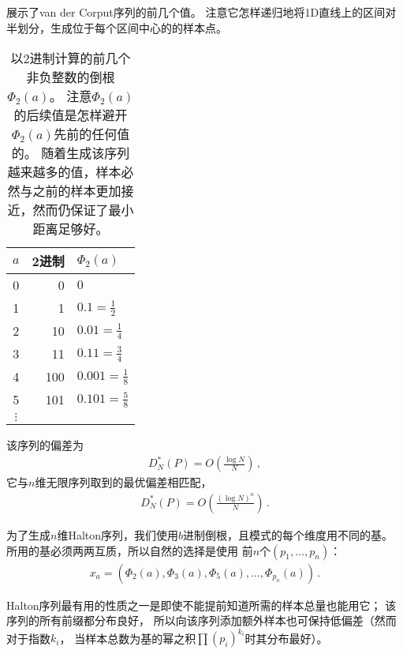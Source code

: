展示了van der Corput序列的前几个值。
注意它怎样递归地将1D直线上的区间对半划分，生成位于每个区间中心的的样本点。
\begin{table}[htbp]
    \centering
    \begin{tabular}{crl}
        \toprule
        $a$      & \textbf{2进制} & $\varPhi_2(a)$      \\
        \midrule
        0        & 0              & $0$                 \\
        1        & 1              & $0.1=\frac{1}{2}$   \\
        2        & 10             & $0.01=\frac{1}{4}$  \\
        3        & 11             & $0.11=\frac{3}{4}$  \\
        4        & 100            & $0.001=\frac{1}{8}$ \\
        5        & 101            & $0.101=\frac{5}{8}$ \\
        $\vdots$ &                &                     \\
        \bottomrule
    \end{tabular}
    \caption{以2进制计算的前几个非负整数的倒根$\varPhi_2(a)$。
        注意$\varPhi_2(a)$的后续值是怎样避开$\varPhi_2(a)$先前的任何值的。
        随着生成该序列越来越多的值，样本必然与之前的样本更加接近，然而仍保证了最小距离足够好。}
    \label{tab:7.3}
\end{table}

该序列的偏差为
\begin{align*}
    D^*_N(P)=O\left(\frac{\log N}{N}\right)\, ,
\end{align*}
它与$n$维无限序列取到的最优偏差相匹配，
\begin{align*}
    D^*_N(P)=O\left(\frac{(\log N)^n}{N}\right)\, .
\end{align*}

为了生成$n$维Halton序列，我们使用$b$进制倒根，且模式的每个维度用不同的基。
所用的基必须两两互质，所以自然的选择是使用
前$n$个$(p_1,\ldots,p_n)$：
\begin{align*}
    x_a=(\varPhi_2(a),\varPhi_3(a),\varPhi_5(a),\ldots,\varPhi_{p_n}(a))\, .
\end{align*}

Halton序列最有用的性质之一是即使不能提前知道所需的样本总量也能用它；
该序列的所有前缀都分布良好，
所以向该序列添加额外样本也可保持低偏差（然而对于指数$k_i$，
当样本总数为基的幂之积$\prod(p_i)^{k_i}$时其分布最好）。


